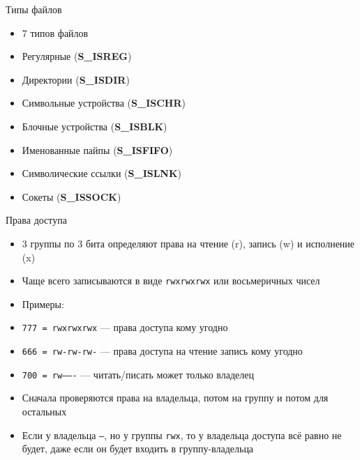 \documentclass[10pt,pdf,hyperref={unicode}]{beamer}
\begin{document}
\begin{frame}{Типы файлов}
\begin{itemize}
    \item 7 типов файлов
    \item Регулярные (\textbf{S\_ISREG})
    \item Директории (\textbf{S\_ISDIR})
    \item Символьные устройства (\textbf{S\_ISCHR})
    \item Блочные устройства (\textbf{S\_ISBLK})
    \item Именованные пайпы (\textbf{S\_ISFIFO})
    \item Символические ссылки (\textbf{S\_ISLNK})
    \item Сокеты (\textbf{S\_ISSOCK})
\end{itemize}
\end{frame}

\begin{frame}{Права доступа}
\begin{itemize}
    \item 3 группы по 3 бита определяют права на чтение (r), запись (w) и исполнение (x)
    \item Чаще всего записываются в виде \texttt{rwxrwxrwx} или восьмеричных чисел
    \item Примеры:
    \item \texttt{777 = rwxrwxrwx} — права доступа кому угодно
    \item \texttt{666 = rw-rw-rw-} — права доступа на чтение запись кому угодно
    \item \texttt{700 = rw-------} — читать/писать может только владелец
    \item Сначала проверяются права на владельца, потом на группу и потом для остальных
    \item Если у владельца \texttt{---}, но у группы \texttt{rwx}, то у владельца доступа всё равно не будет, даже если он будет входить в группу-владельца
\end{itemize}
\end{frame}
\end{document}
